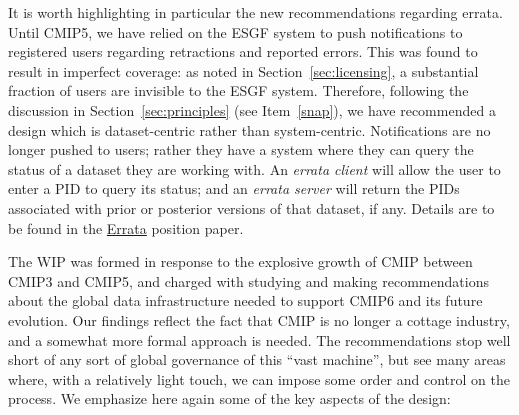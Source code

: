 \documentclass[gmd,manuscript]{copernicus}
\newcommand{\secref}[1] {\mbox{Section  \ref{sec:#1}}}
\begin{document}
It is worth highlighting in particular the new recommendations
regarding errata. Until CMIP5, we have relied on the ESGF system to
push notifications to registered users regarding retractions and
reported errors. This was found to result in imperfect coverage: as
noted in \secref{licensing}, a substantial fraction of users are
invisible to the ESGF system. Therefore, following the discussion in
\secref{principles} (see Item~\ref{snap}), we have recommended a
design which is dataset-centric rather than system-centric.
Notifications are no longer pushed to users; rather they have a system
where they can query the status of a dataset they are working with. An
\emph{errata client} will allow the user to enter a PID to query its
status; and an \emph{errata server} will return the PIDs associated
with prior or posterior versions of that dataset, if any. Details are
to be found in the \href{https://goo.gl/qjs8WK}{Errata} position
paper.

\label{sec:summary}

The WIP was formed in response to the explosive growth of CMIP between
CMIP3 and CMIP5, and charged with studying and making recommendations
about the global data infrastructure needed to support CMIP6 and its
future evolution. Our findings reflect the fact that CMIP is no longer
a cottage industry, and a somewhat more formal approach is needed. The
recommendations stop well short of any sort of global governance of
this ``vast machine'', but see many areas where, with a relatively
light touch, we can impose some order and control on the process. We
emphasize here again some of the key aspects of the design:
\end{document}

